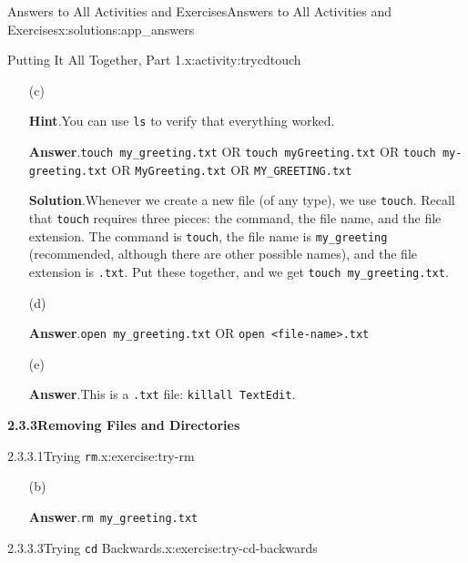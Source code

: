 \documentclass[oneside,10pt,]{book}
\newcommand{\blocktitlefont}{\relax}
\newcommand{\mono}[1]{\texttt{#1}}
\begin{document}
\begin{solutions-chapter}{Answers to All Activities and Exercises}{}{Answers to All Activities and Exercises}{}{}{x:solutions:app_answers}
\begin{activitysolution}{2.2}{Putting It All Together, Part 1.}{x:activity:trycdtouch}
\begin{enumerate}[font=\bfseries,label=(\alph*),ref=\alph*]
\begin{codedisplay}
/c/Users/<your-username>/Desktop/testdir
\end{codedisplay}
%
\item[(c)]\par\smallskip%
\noindent\textbf{\blocktitlefont Hint}.\hypertarget{g:hint:idm480511480-back}{}\quad{}You can use \mono{ls} to verify that everything worked.%
\par\smallskip%
\noindent\textbf{\blocktitlefont Answer}.\hypertarget{g:answer:idm480505336-back}{}\quad{}\mono{touch my\_greeting.txt} OR \mono{touch myGreeting.txt} OR \mono{touch my-greeting.txt} OR \mono{MyGreeting.txt} OR \mono{MY\_GREETING.txt}%
\par\smallskip%
\noindent\textbf{\blocktitlefont Solution}.\hypertarget{g:solution:idm480504952-back}{}\quad{}Whenever we create a new file (of any type), we use \mono{touch}. Recall that \mono{touch} requires three pieces: the command, the file name, and the file extension. The command is \mono{touch}, the file name is \mono{my\_greeting} (recommended, although there are other possible names), and the file extension is \mono{.txt}. Put these together, and we get \mono{touch my\_greeting.txt}.%
\item[(d)]\par\smallskip%
\noindent\textbf{\blocktitlefont Answer}.\hypertarget{g:answer:idm480498552-back}{}\quad{}\mono{open my\_greeting.txt} OR \mono{open <file-name>.txt}%
\item[(e)]\par\smallskip%
\noindent\textbf{\blocktitlefont Answer}.\hypertarget{g:answer:idm480497144-back}{}\quad{}This is a \mono{.txt} file: \mono{killall TextEdit}.%
\end{enumerate}
\end{activitysolution}%
\par\medskip
\noindent\textbf{\Large{}2.3.3\space\textperiodcentered\space{}Removing Files and Directories}
\begin{inlinesolution}{2.3.3.1}{Trying \mono{rm}.}{x:exercise:try-rm}%
\begin{enumerate}[font=\bfseries,label=(\alph*),ref=\alph*]
\item[(b)]\par\smallskip%
\noindent\textbf{\blocktitlefont Answer}.\hypertarget{g:answer:idm480479992-back}{}\quad{}\mono{rm my\_greeting.txt}%
\end{enumerate}
\end{inlinesolution}%
\begin{inlinesolution}{2.3.3.3}{Trying \mono{cd} Backwards.}{x:exercise:try-cd-backwards}%

\end{inlinesolution}
\end{solutions-chapter}
\end{document}
